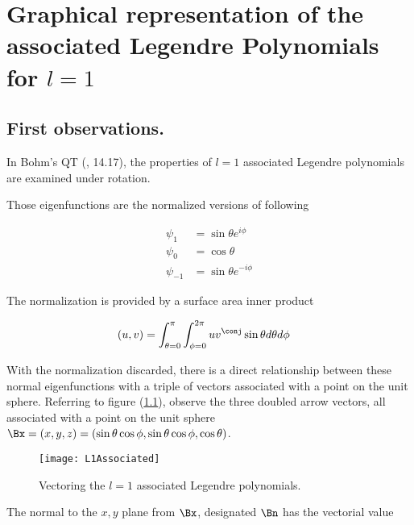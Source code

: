 

\chapter{Graphical representation of the associated Legendre Polynomials for $l=1$}
\label{chap:L1Associated}
{}
\date{Aug 16, 2009}

\beginArtNoToc

\section{First observations.}

In Bohm's QT (\cite{bohm1989qt}, 14.17), the properties of $l=1$ associated Legendre polynomials are examined under rotation.

Those eigenfunctions are the normalized versions of following

\begin{align}\label{eqn:foo1}
\psi_1 &= \sin\theta e^{i\phi} \\
\psi_0 &= \cos\theta \\
\psi_{-1} &= \sin\theta e^{-i\phi}
\end{align}

The normalization is provided by a surface area inner product

\begin{align}\label{eqn:foo2}
(u,v) &= \int_{\theta=0}^{\pi} \int_{\phi=0}^{2\pi} u v^\conj \sin\theta d\theta d\phi
\end{align}

With the normalization discarded, there is a direct relationship between these normal eigenfunctions with a triple of vectors associated with a point on the unit sphere.  Referring to figure (\ref{fig:L1Associated}), observe the three doubled arrow vectors, all associated with a point on the unit sphere $\Bx = (x,y,z) = (\sin\theta \cos\phi, \sin\theta \cos\phi, \cos\theta)$.  

\begin{figure}[htp]
\centering
\texttt{[image: L1Associated]}
\caption{Vectoring the $l=1$ associated Legendre polynomials.}\label{fig:L1Associated}
\end{figure}

The normal to the $x,y$ plane from $\Bx$, designated $\Bn$ has the vectorial value

